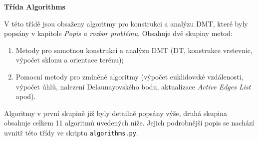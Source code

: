 \bigbreak

\par {\large\textbf{Třída Algorithms} }
\par V této třídě jsou obsaženy algoritmy pro konstrukci a analýzu DMT, které byly popsány v kapitole \emph{Popis a rozbor problému}. Obsahuje dvě skupiny metod:
\begin{enumerate}
    \item Metody pro samotnou konstrukci a analýzu DMT (DT, konstrukce vrstevnic, výpočet sklonu a orientace terénu);
    \item Pomocní metody pro zmíněné algoritmy (výpočet euklidovské vzdálenosti, výpočet úhlů, nalezení Delaunayovského bodu, aktualizace \emph{Active Edges List} apod).
\end{enumerate}

Algoritmy v první skupině  již byly detailně popsány výše, druhá skupina obsahuje celkem 11 algoritmů uvedených níže. Jejich podrobnější popis se nachází uvnitř této třídy ve skriptu \verb|algorithms.py|.

